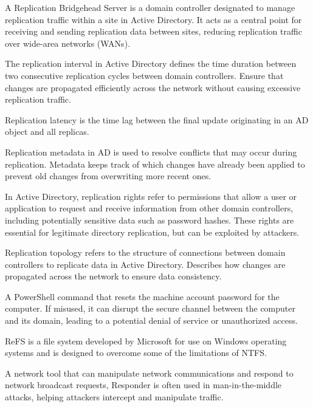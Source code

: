  A Replication Bridgehead Server is a domain controller designated to manage replication traffic within a site in Active Directory. It acts as a central point for receiving and sending replication data between sites, reducing replication traffic over wide-area networks (WANs).

 The replication interval in Active Directory defines the time duration between two consecutive replication cycles between domain controllers. Ensure that changes are propagated efficiently across the network without causing excessive replication traffic.

 Replication latency is the time lag between the final update originating in an AD object and all replicas.

 Replication metadata in AD is used to resolve conflicts that may occur during replication. Metadata keeps track of which changes have already been applied to prevent old changes from overwriting more recent ones.

 In Active Directory, replication rights refer to permissions that allow a user or application to request and receive information from other domain controllers, including potentially sensitive data such as password hashes. These rights are essential for legitimate directory replication, but can be exploited by attackers.

 Replication topology refers to the structure of connections between domain controllers to replicate data in Active Directory. Describes how changes are propagated across the network to ensure data consistency.

 A PowerShell command that resets the machine account password for the computer. If misused, it can disrupt the secure channel between the computer and its domain, leading to a potential denial of service or unauthorized access.

 ReFS is a file system developed by Microsoft for use on Windows operating systems and is designed to overcome some of the limitations of NTFS.

 A network tool that can manipulate network communications and respond to network broadcast requests, Responder is often used in man-in-the-middle attacks, helping attackers intercept and manipulate traffic.

